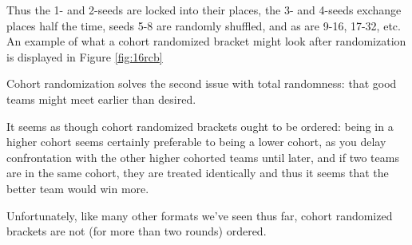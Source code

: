 {    Thus the 1- and 2-seeds are locked into their places, the 3- and 4-seeds exchange places half the time, seeds 5-8 are randomly shuffled, and as are 9-16, 17-32, etc. An example of what a cohort randomized bracket might look after randomization is displayed in Figure \ref{fig:16rcb}

    
    Cohort randomization solves the second issue with total randomness: that good teams might meet earlier than desired.
    

    It seems as though cohort randomized brackets ought to be ordered: being in a higher cohort seems certainly preferable to being a lower cohort, as you delay confrontation with the other higher cohorted teams until later, and if two teams are in the same cohort, they are treated identically and thus it seems that the better team would win more.

    Unfortunately, like many other formats we've seen thus far, cohort randomized brackets are not (for more than two rounds) ordered. 

        

}
